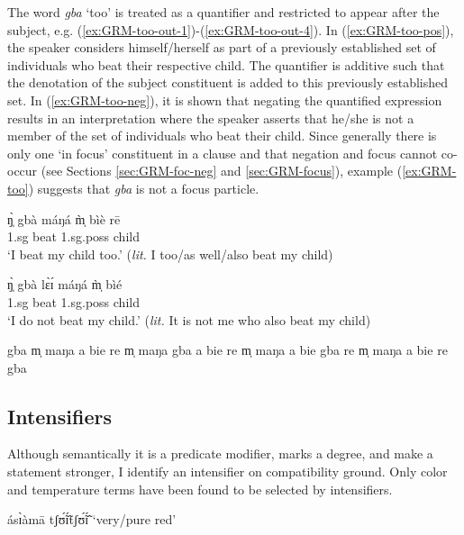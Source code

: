 \begin{exe}
\begin{exe}
\begin{exe}
{\begin{exe}
\begin{exe}
\begin{exe}
\begin{exe}
\begin{exe}
\begin{exe}
\begin{exe}
\begin{xlist}
\begin{exe}
\begin{exe}
\begin{exe}
The word {\it gba} `too' is treated as a quantifier and restricted to appear
after the subject, e.g. (\ref{ex:GRM-too-out-1})-(\ref{ex:GRM-too-out-4}). In
(\ref{ex:GRM-too-pos}), the speaker  considers himself/herself  as part of a
previously established set of individuals who beat their respective child. The
quantifier is additive such that  the denotation of the subject constituent is
added to this previously established set.  In (\ref{ex:GRM-too-neg}), it is
shown that negating the quantified expression results in an interpretation where
the speaker asserts that he/she is not a member of the set of individuals who
beat their child. Since generally there is only one `in focus' constituent in a
clause and that negation and focus cannot co-occur (see Sections
\ref{sec:GRM-foc-neg} and  \ref{sec:GRM-focus}), example (\ref{ex:GRM-too})
suggests that {\it gba} is not a focus particle.


\ea\label{ex:GRM-too}

 \ea\label{ex:GRM-too-pos}
\gll ŋ̩̀ gbà máŋá m̩̀ bìè rē \\
{\sc 1.sg} {\quant} beat {\sc 1.sg.poss}  child {\foc}\\
\glt  `I beat my child too.' ({\it lit.} I too/as well/also beat my
child)

 \ex\label{ex:GRM-too-neg}
\gll ŋ̩̀ gbà lɛ̀ɪ́ máŋá  m̩̀ bìé  \\
{\sc 1.sg} {\quant}  {\neg} beat {\sc 1.sg.poss}  child \\
\glt  `I do not beat my child.' ({\it lit.} It is not me who  also
beat my child)


 \ex\label{ex:GRM-too-out-1}   \textasteriskcentered  gba m̩  maŋa a bie re
\ex \textasteriskcentered  m̩ maŋa gba a bie re
 \ex \textasteriskcentered  m̩ maŋa  a bie gba re
 \ex\label{ex:GRM-too-out-4} \textasteriskcentered  m̩ maŋa  a bie  re gba

\z 
 \z

\subsection{Intensifiers}
\label{sec:GRM-intensifier}

Although semantically it is a predicate modifier, marks a degree,  and make a 
statement stronger, I identify an intensifier on compatibility ground. Only 
color   and temperature terms have been found to be selected 
by intensifiers.


\ea\label{ex:intens-ideo} 

\ea  ásɪ̀àmā tʃʊ̃́ɪ̃́tʃʊ̃́ɪ̃́   {\rm `very/pure  red'}
\label{ex:BCTmod-prop-red}


\end{exe}
\end{exe}
\end{exe}
\end{xlist}
\end{exe}
\end{exe}
\end{exe}
\end{exe}
\end{exe}
\end{exe}
\end{exe}}
\end{exe}
\end{exe}
\end{exe}
